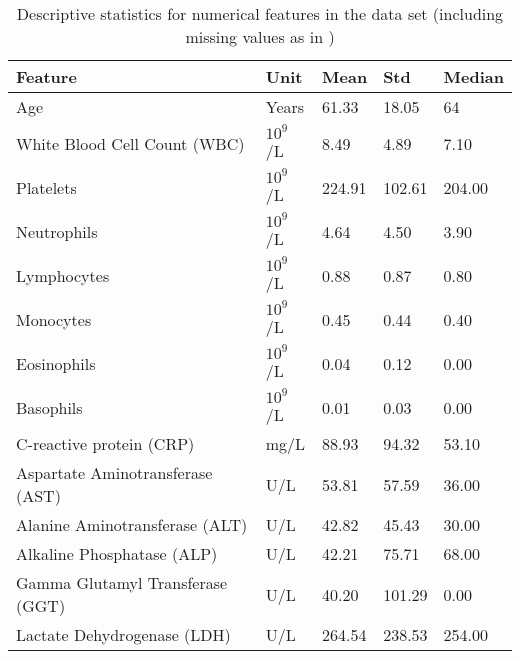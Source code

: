 \begin{table}
\centering
\begin{tabular}{lllll}
Feature                          & Unit                    & Mean   & Std    & 
Median \\ \hline
Age                              & Years                   & 61.33  & 18.05  & 
64     \\
White Blood Cell Count (WBC)     & $10^9$/L & 8.49   & 4.89   & 
7.10   \\
Platelets                        & $10^9$/L & 224.91  & 102.61  & 
204.00 \\
Neutrophils                      & $10^9$/L & 4.64   & 4.50   & 
3.90   \\
Lymphocytes                      & $10^9$/L & 0.88   & 0.87   & 
0.80   \\
Monocytes                        & $10^9$/L & 0.45   & 0.44   & 
0.40   \\
Eosinophils                      & $10^9$/L & 0.04   & 0.12   & 
0.00   \\
Basophils                        & $10^9$/L & 0.01   & 0.03   & 
0.00   \\
C-reactive protein (CRP)         & mg/L                    & 88.93  & 94.32  & 
53.10  \\
Aspartate Aminotransferase (AST) & U/L                     & 53.81  & 57.59  & 
36.00  \\
Alanine Aminotransferase (ALT)   & U/L                     & 42.82  & 45.43  & 
30.00  \\
Alkaline Phosphatase (ALP)       & U/L                     & 42.21  & 75.71  & 
68.00  \\
Gamma Glutamyl Transferase (GGT) & U/L                     & 40.20  & 101.29 & 
0.00  \\
Lactate Dehydrogenase (LDH)      & U/L                     & 264.54 & 238.53 
& 254.00
\end{tabular}
\caption{Descriptive statistics for numerical features in the data set 
(including 
missing values as in \cite{RN127})}
\label{tab:feature-dist-NAN}
\end{table}
